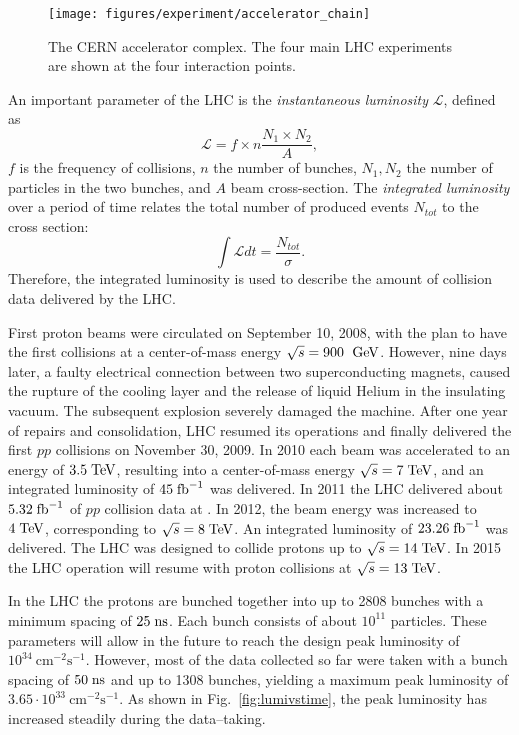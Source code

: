 \begin{figure}[ht]
\begin{center}
\texttt{[image: figures/experiment/accelerator\_chain]}
\caption[CERN Accelerator complex]{
  The CERN accelerator complex. The four main LHC experiments are
  shown at the four interaction points.}
\label{fig:lhc}
\end{center}
\end{figure}

An important parameter of the LHC is the {\it
  instantaneous luminosity}  $\mathcal L$, defined as
\begin{equation}\label{eq:lumiN}
\mathcal{L}=f\times n\dfrac{N_1\times N_2}{A},
\end{equation} 
$f$ is the frequency of collisions, $n$ the number of bunches, $N_1,
N_2$ the number of particles in the two bunches, and $A$ beam
cross-section.
The \textit{integrated luminosity} over a period of time relates the
total number of produced events $N_{tot}$ to the cross section:
\begin{equation}\label{eq:intLumi}
\int \mathcal L dt  = \dfrac{N_{tot}}{\sigma}.
\end{equation}
Therefore, the integrated luminosity is used to describe the amount of
collision data delivered by the LHC.

First proton beams were circulated on September 10, 2008, with the
plan to have the first collisions at a center-of-mass energy
$\sqrt{s}=900~\; \mathrm{GeV}{}$. However, nine days later, a faulty electrical
connection between two superconducting magnets, caused the rupture of
the cooling layer and the release of liquid Helium in the insulating
vacuum. The subsequent explosion severely damaged the machine.
After one year of repairs and consolidation, LHC resumed its
operations and finally delivered the first $pp$ collisions on November
30, 2009.
In 2010 each beam was accelerated to an energy of \mbox{$3.5 \; \mathrm{TeV}$}, 
resulting into a center-of-mass energy \mbox{$\sqrt{s} = 7 \; \mathrm{TeV}$}, and
an integrated luminosity of $45\; \mathrm{fb}^{-1}$ was delivered.
In 2011 the LHC delivered about $5.32\; \mathrm{fb}^{-1}{}$ of $pp$ collision data at \seventev{}.
In 2012, the beam energy was increased to \mbox{$4 \; \mathrm{TeV}$}, 
corresponding to \mbox{$\sqrt{s} = 8 \; \mathrm{TeV}$}. An integrated luminosity
of $23.26\; \mathrm{fb}^{-1}{}$ was delivered.
The LHC was designed to collide protons up to \mbox{$\sqrt{s} = 14
  \; \mathrm{TeV}$}. In 2015 the LHC operation will resume with proton collisions
at \mbox{$\sqrt{s} = 13 \; \mathrm{TeV}$}. 

In the LHC the protons are bunched together into up to 2808 bunches 
with a minimum spacing of \mbox{$25 \; \mathrm{ns}$}. 
Each bunch consists of about $10^{11}$ particles. 
These parameters will allow in the future to reach 
the design peak luminosity of \mbox{$10^{34}~\mathrm{cm^{-2}s^{-1}}$}.
However, most of the data collected so far were taken with a bunch 
spacing of \mbox{$50 \; \mathrm{ns}$} and up to 1308 bunches, yielding a maximum
peak luminosity of \mbox{$3.65\cdot{}10^{33}~\mathrm{cm^{-2}s^{-1}}$}.
As shown in Fig.~\ref{fig:lumivstime}, the peak luminosity has increased
steadily during the data--taking.

